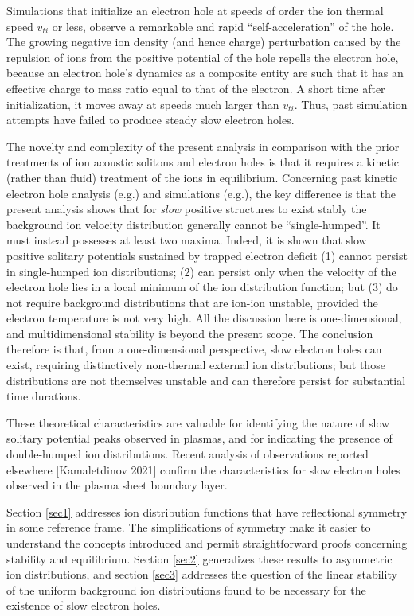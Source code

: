 \documentclass[12pt]{article}
\begin{document}
Simulations that initialize an electron hole at speeds of order the
ion thermal speed $v_{ti}$ or less, observe a remarkable and rapid
``self-acceleration'' of the
hole\cite{Saeki1991,Eliasson2004,Eliasson2006,Zhou2016}. The growing
negative ion density (and hence charge) perturbation caused by the
repulsion of ions from the positive potential of the hole repells the
electron hole, because an electron hole's dynamics as a composite
entity are such that it has an effective charge to mass ratio equal to
that of the electron\cite{Haakonsen2015,Hutchinson2016}. A short time
after initialization, it moves away at speeds much larger than
$v_{ti}$. Thus, past simulation attempts have failed to produce steady
slow electron holes.

The novelty and complexity of the present analysis in comparison with
the prior treatments of ion acoustic solitons and electron holes is
that it requires a kinetic (rather than fluid) treatment of the ions
in equilibrium. Concerning past kinetic electron hole analysis
(e.g.\cite{Dupree1982}) and simulations (e.g.\cite{Eliasson2004}), the
key difference is that the present analysis shows that for \emph{slow}
positive structures to exist stably the background ion velocity
distribution generally cannot be ``single-humped''. It must instead
possesses at least two maxima.  Indeed, it is shown that slow positive
solitary potentials sustained by trapped electron deficit (1) cannot
persist in single-humped ion distributions; (2) can persist only when
the velocity of the electron hole lies in a local minimum of the ion
distribution function; but (3) do not require background distributions
that are ion-ion unstable, provided the electron temperature is not
very high. All the discussion here is one-dimensional, and
multidimensional stability is beyond the present scope. The conclusion
therefore is that, from a one-dimensional perspective, slow electron
holes can exist, requiring distinctively non-thermal external ion
distributions; but those distributions are not themselves unstable and
can therefore persist for substantial time durations.

These theoretical characteristics are valuable for identifying the
nature of slow solitary potential peaks observed in plasmas, and for
indicating the presence of double-humped ion distributions. Recent
analysis of observations reported elsewhere [Kamaletdinov 2021] confirm the
characteristics for slow electron holes observed in the plasma sheet
boundary layer.

Section \ref{sec1} addresses ion distribution functions that have
reflectional symmetry in some reference frame. The simplifications of
symmetry make it easier to understand the concepts introduced and
permit straightforward proofs concerning stability and
equilibrium. Section \ref{sec2} generalizes these results to
asymmetric ion distributions, and section \ref{sec3} addresses the
question of the linear stability of the uniform background ion distributions
found to be necessary for the existence of slow electron holes.
\end{document}
